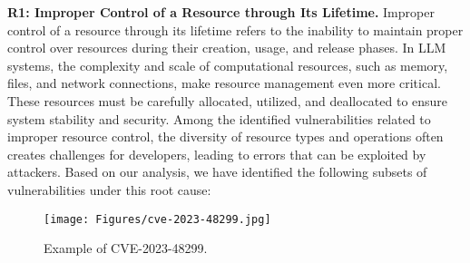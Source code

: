 \noindent \textbf{R1: Improper Control of a Resource through Its Lifetime.} 
Improper control of a resource through its lifetime refers to the inability to maintain proper control over resources during their creation, usage, and release phases. In LLM systems, the complexity and scale of computational resources, such as memory, files, and network connections, make resource management even more critical. These resources must be carefully allocated, utilized, and deallocated to ensure system stability and security. Among the identified vulnerabilities related to improper resource control, the diversity of resource types and operations often creates challenges for developers, leading to errors that can be exploited by attackers. Based on our analysis, we have identified the following subsets of vulnerabilities under this root cause:

\begin{figure}[t]
    \centering
    \texttt{[image: Figures/cve-2023-48299.jpg]}
    \caption{Example of CVE-2023-48299.}
    \label{fig:cve-2023-48299}
\end{figure}

